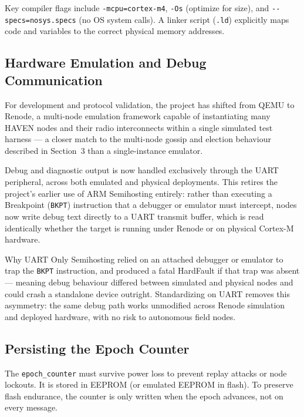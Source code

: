 \documentclass[11pt,a4paper]{article}
\newcommand{\citeref}[1]{}
\begin{document}
Key compiler flags include \texttt{-mcpu=cortex-m4}, \texttt{-Os} (optimize for size), and \texttt{-{}-specs=nosys.specs} (no OS system calls).\citeref{4} A linker script (\texttt{.ld}) explicitly maps code and variables to the correct physical memory addresses.\citeref{4}

\subsection{Hardware Emulation and Debug Communication}

For development and protocol validation, the project has shifted from QEMU to Renode, a multi-node emulation framework capable of instantiating many HAVEN nodes and their radio interconnects within a single simulated test harness --- a closer match to the multi-node gossip and election behaviour described in Section~3 than a single-instance emulator.

Debug and diagnostic output is now handled exclusively through the UART peripheral, across both emulated and physical deployments. This retires the project's earlier use of ARM Semihosting entirely: rather than executing a Breakpoint (\texttt{BKPT}) instruction that a debugger or emulator must intercept, nodes now write debug text directly to a UART transmit buffer, which is read identically whether the target is running under Renode or on physical Cortex-M hardware.

\begin{notebox}{Why UART Only}
Semihosting relied on an attached debugger or emulator to trap the \texttt{BKPT} instruction, and produced a fatal HardFault if that trap was absent --- meaning debug behaviour differed between simulated and physical nodes and could crash a standalone device outright. Standardizing on UART removes this asymmetry: the same debug path works unmodified across Renode simulation and deployed hardware, with no risk to autonomous field nodes.
\end{notebox}

\subsection{Persisting the Epoch Counter}

The \texttt{epoch\_counter} must survive power loss to prevent replay attacks or node lockouts.\citeref{4} It is stored in EEPROM (or emulated EEPROM in flash).\citeref{4} To preserve flash endurance, the counter is only written when the epoch advances, not on every message.\citeref{4}
\end{document}
